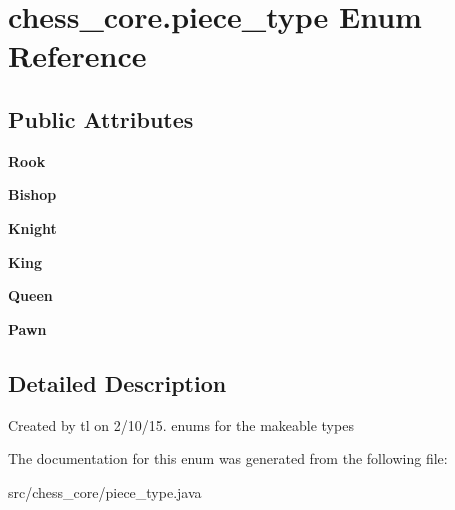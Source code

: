 \hypertarget{enumchess__core_1_1piece__type}{}\section{chess\+\_\+core.\+piece\+\_\+type Enum Reference}
\label{enumchess__core_1_1piece__type}
\subsection*{Public Attributes}
\begin{DoxyCompactItemize}
\item 
\hypertarget{enumchess__core_1_1piece__type_a427cc084c192a5499565270fd5e3ddc1}{}{\bfseries Rook}\label{enumchess__core_1_1piece__type_a427cc084c192a5499565270fd5e3ddc1}

\item 
\hypertarget{enumchess__core_1_1piece__type_a7349952c1bcc5dcfc59d3d713e9f0a60}{}{\bfseries Bishop}\label{enumchess__core_1_1piece__type_a7349952c1bcc5dcfc59d3d713e9f0a60}

\item 
\hypertarget{enumchess__core_1_1piece__type_a652ab261ad39276e67b8c8f6cd537e1c}{}{\bfseries Knight}\label{enumchess__core_1_1piece__type_a652ab261ad39276e67b8c8f6cd537e1c}

\item 
\hypertarget{enumchess__core_1_1piece__type_a2cef34c95f682b292c9d60b0266e6c34}{}{\bfseries King}\label{enumchess__core_1_1piece__type_a2cef34c95f682b292c9d60b0266e6c34}

\item 
\hypertarget{enumchess__core_1_1piece__type_adab30e670a64d0505076a2ccfcc36980}{}{\bfseries Queen}\label{enumchess__core_1_1piece__type_adab30e670a64d0505076a2ccfcc36980}

\item 
\hypertarget{enumchess__core_1_1piece__type_ab31ceb7e41830bfbe64f5da564caaaf4}{}{\bfseries Pawn}\label{enumchess__core_1_1piece__type_ab31ceb7e41830bfbe64f5da564caaaf4}

\end{DoxyCompactItemize}


\subsection{Detailed Description}
Created by tl on 2/10/15. enums for the makeable types 

The documentation for this enum was generated from the following file\+:\begin{DoxyCompactItemize}
\item 
src/chess\+\_\+core/piece\+\_\+type.\+java\end{DoxyCompactItemize}
